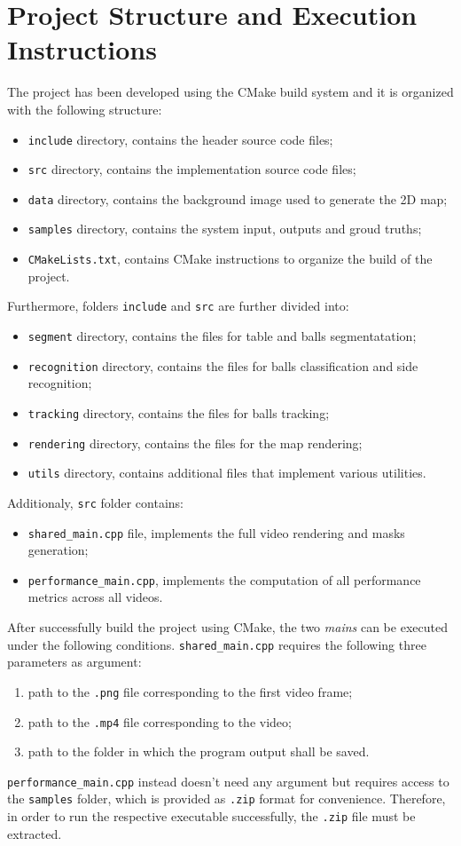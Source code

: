 \section{Project Structure and Execution Instructions}


The project has been developed using the CMake build system and it is organized with the
following structure:
\begin{itemize}
    \item \verb|include| directory, contains the header source code files;
    \item \verb|src| directory, contains the implementation source code files;
    \item \verb|data| directory, contains the background image used to generate the 2D map;
    \item \verb|samples| directory, contains the system input, outputs and groud truths;
    \item \verb|CMakeLists.txt|, contains CMake instructions to organize the build of the project. 
\end{itemize}

\noindent
Furthermore, folders \verb|include| and \verb|src| are further divided into:
\begin{itemize}
    \item \verb|segment| directory, contains the files for table and balls segmentatation;
    \item \verb|recognition| directory, contains the files for balls classification and side recognition;
    \item \verb|tracking| directory, contains the files for balls tracking;
    \item \verb|rendering| directory, contains the files for the map rendering;
    \item \verb|utils| directory, contains additional files that implement various utilities.
\end{itemize}

\noindent
Additionaly, \verb|src| folder contains:
\begin{itemize}
    \item \verb|shared_main.cpp| file, implements the full video rendering and masks generation;
    \item \verb|performance_main.cpp|, implements the computation of all performance metrics across all videos.
\end{itemize}

\noindent
After successfully build the project using CMake, the two \textit{mains} can be executed under the following conditions.
\verb|shared_main.cpp| requires the following three parameters as argument:
\begin{enumerate}
    \item path to the \verb|.png| file corresponding to the first video frame;
    \item path to the \verb|.mp4| file corresponding to the video;
    \item path to the folder in which the program output shall be saved.
\end{enumerate}

\noindent
\verb|performance_main.cpp| instead doesn't need any argument but requires access to the \verb|samples| folder,
which is provided as \verb|.zip| format for convenience. Therefore, in order to run the respective executable
successfully, the \verb|.zip| file must be extracted.
